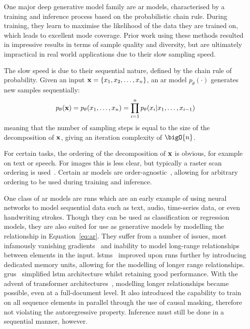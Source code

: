 One major deep generative model family are \acrfull{ar} models, characterised by
a training and inference process based on the probabilistic chain rule. During
training, they learn to maximise the likelihood of the data they are
trained on, which leads to excellent mode coverage. Prior work using these
methods resulted in impressive results in terms of sample quality and
diversity, but are ultimately impractical in real world applications due to
their slow sampling speed.

The slow speed is due to their sequential nature, defined by the chain
rule of probability. Given an input $\mathbf{x} = \{ x_{1}, x_{2}, \dots,
x_{n} \}$, an \gls{ar} model $p_\theta(\cdot)$ generates new
samples sequentially:
\begin{equation}\label{eq:ar}
    p_\theta(\mathbf{x}) = p_\theta(x_{1}, \dots, x_{n}) =
    \prod\limits^{n}_{i=1} p_\theta(x_{i} \vert x_{1}, \dots, x_{i-1})
\end{equation}
meaning that the number of sampling steps is equal to the size of the
decomposition of $\mathbf{x}$, giving an iteration complexity of $\bigO{n}$.

For certain tasks, the ordering of the decomposition of $\mathbf{x}$ is obvious, for
example on text or speech. For images this is less clear, but typically a
raster scan ordering is used~\cite{parmar2018image}. Certain \gls{ar} models are
order-agnostic~\cite{hoogeboom2021autoregressive}, allowing for arbitrary ordering
to be used during training and inference.

One class of \gls{ar} models are \glspl{rnn} which are an early example of using
neural networks to model sequential data such as text, audio, time-series data,
or even handwriting strokes. Though they can be used as classification or
regression models, they are also suited for use as generative models by
modelling the relationship in Equation~\ref{eq:ar}. They suffer from a number of
issues, most infamously vanishing gradients~\cite{pascanu2012rnn} and inability
to model long-range relationships between elements in the input.
\Glspl{lstm}~\cite{hoch1997lstm} improved upon \glspl{rnn} further by
introducing dedicated memory units, allowing for the modelling of longer range
relationships. \Glspl{gru}~\cite{cho2014gru} simplified \gls{lstm} architecture
whilst retaining good performance. With the advent of transformer
architectures~\cite{vaswani2017attention}, modelling longer relationships
became possible, even at a full-document level. It also introduced the
capability to train on all sequence elements in parallel through the use of
causal masking, therefore not violating the autoregressive property. Inference
must still be done in a sequential manner, however.

